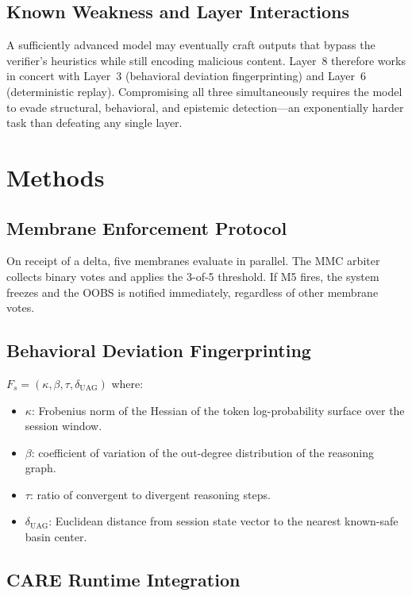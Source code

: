 \documentclass[11pt]{article}
\begin{document}
\subsection{Known Weakness and Layer Interactions}

A sufficiently advanced model may eventually craft outputs that bypass the
verifier's heuristics while still encoding malicious content.
Layer~8 therefore works in concert with Layer~3 (behavioral deviation
fingerprinting) and Layer~6 (deterministic replay).
Compromising all three simultaneously requires the model to evade
structural, behavioral, and epistemic detection---an exponentially harder
task than defeating any single layer.

\section{Methods}

\subsection{Membrane Enforcement Protocol}

On receipt of a delta, five membranes evaluate in parallel.
The MMC arbiter collects binary votes and applies the 3-of-5 threshold.
If M5 fires, the system freezes and the OOBS is notified immediately,
regardless of other membrane votes.

\subsection{Behavioral Deviation Fingerprinting}

$F_s = (\kappa, \beta, \tau, \delta_{\mathrm{UAG}})$ where:
\begin{itemize}[noitemsep]
\item $\kappa$: Frobenius norm of the Hessian of the token log-probability
  surface over the session window.
\item $\beta$: coefficient of variation of the out-degree distribution of
  the reasoning graph.
\item $\tau$: ratio of convergent to divergent reasoning steps.
\item $\delta_{\mathrm{UAG}}$: Euclidean distance from session state vector
  to the nearest known-safe basin center.
\end{itemize}

\subsection{CARE Runtime Integration}
\end{document}
